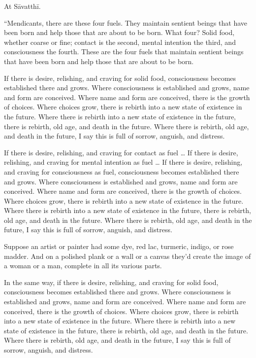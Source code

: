 \documentclass[12pt,openany]{book}%
\begin{document}
At \textsanskrit{Sāvatthī}. 

“Mendicants, there are these four fuels. They maintain sentient beings that have been born and help those that are about to be born. What four? Solid food, whether coarse or fine; contact is the second, mental intention the third, and consciousness the fourth. These are the four fuels that maintain sentient beings that have been born and help those that are about to be born. 

If there is desire, relishing, and craving for solid food, consciousness becomes established there and grows. Where consciousness is established and grows, name and form are conceived. Where name and form are conceived, there is the growth of choices. Where choices grow, there is rebirth into a new state of existence in the future. Where there is rebirth into a new state of existence in the future, there is rebirth, old age, and death in the future. Where there is rebirth, old age, and death in the future, I say this is full of sorrow, anguish, and distress. 

If there is desire, relishing, and craving for contact as fuel … If there is desire, relishing, and craving for mental intention as fuel … If there is desire, relishing, and craving for consciousness as fuel, consciousness becomes established there and grows. Where consciousness is established and grows, name and form are conceived. Where name and form are conceived, there is the growth of choices. Where choices grow, there is rebirth into a new state of existence in the future. Where there is rebirth into a new state of existence in the future, there is rebirth, old age, and death in the future. Where there is rebirth, old age, and death in the future, I say this is full of sorrow, anguish, and distress. 

Suppose an artist or painter had some dye, red lac, turmeric, indigo, or rose madder. And on a polished plank or a wall or a canvas they’d create the image of a woman or a man, complete in all its various parts. 

In the same way, if there is desire, relishing, and craving for solid food, consciousness becomes established there and grows. Where consciousness is established and grows, name and form are conceived. Where name and form are conceived, there is the growth of choices. Where choices grow, there is rebirth into a new state of existence in the future. Where there is rebirth into a new state of existence in the future, there is rebirth, old age, and death in the future. Where there is rebirth, old age, and death in the future, I say this is full of sorrow, anguish, and distress. 
\end{document}
